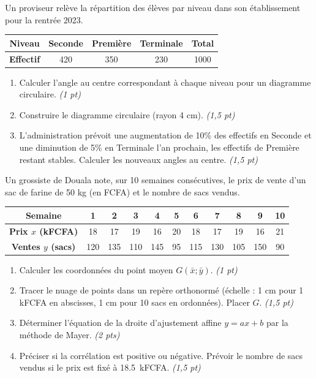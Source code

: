 \documentclass[11pt]{article}
\begin{document}
\begin{exercice}
Un proviseur relève la répartition des élèves par niveau dans son établissement pour la rentrée 2023.
\begin{center}
\begin{tabular}{|c|c|c|c|c|}
\hline
\textbf{Niveau} & \textbf{Seconde} & \textbf{Première} & \textbf{Terminale} & \textbf{Total} \\ \hline
\textbf{Effectif} & 420 & 350 & 230 & 1000 \\ \hline
\end{tabular}
\end{center}
\begin{enumerate}
    \item Calculer l'angle au centre correspondant à chaque niveau pour un diagramme circulaire. \textit{(1 pt)}
    \item Construire le diagramme circulaire (rayon 4 cm). \textit{(1,5 pt)}
    \item L'administration prévoit une augmentation de 10\% des effectifs en Seconde et une diminution de 5\% en Terminale l'an prochain, les effectifs de Première restant stables. Calculer les nouveaux angles au centre. \textit{(1,5 pt)}
\end{enumerate}
\end{exercice}

\begin{exercice}
Un grossiste de Douala note, sur 10 semaines consécutives, le prix de vente d'un sac de farine de 50 kg (en FCFA) et le nombre de sacs vendus.
\begin{center}
\begin{tabular}{|c|c|c|c|c|c|c|c|c|c|c|}
\hline
\textbf{Semaine} & 1 & 2 & 3 & 4 & 5 & 6 & 7 & 8 & 9 & 10 \\ \hline
\textbf{Prix $x$ (kFCFA)} & 18 & 17 & 19 & 16 & 20 & 18 & 17 & 19 & 16 & 21 \\ \hline
\textbf{Ventes $y$ (sacs)} & 120 & 135 & 110 & 145 & 95 & 115 & 130 & 105 & 150 & 90 \\ \hline
\end{tabular}
\end{center}
\begin{enumerate}
    \item Calculer les coordonnées du point moyen $G(\bar{x};\bar{y})$. \textit{(1 pt)}
    \item Tracer le nuage de points dans un repère orthonormé (échelle : 1 cm pour 1 kFCFA en abscisses, 1 cm pour 10 sacs en ordonnées). Placer $G$. \textit{(1,5 pt)}
    \item Déterminer l'équation de la droite d'ajustement affine $y = ax + b$ par la méthode de Mayer. \textit{(2 pts)}
    \item Préciser si la corrélation est positive ou négative. Prévoir le nombre de sacs vendus si le prix est fixé à \SI{18,5}{kFCFA}. \textit{(1,5 pt)}
\end{enumerate}
\end{exercice}
\end{document}
